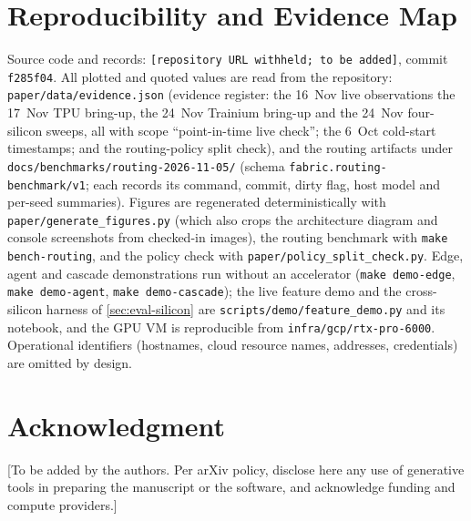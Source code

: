 \documentclass[conference,letterpaper]{IEEEtran}
\newcommand{\code}[1]{\texttt{\small #1}}
\newcommand{\repourl}{\texttt{[repository URL withheld; to be added]}}
\newcommand{\commit}{\code{f285f04}}
\begin{document}
\section{Reproducibility and Evidence Map}
\label{app:repro}
{\raggedright
Source code and records: \repourl, commit \commit. All plotted and quoted values are read from
the repository: \code{paper/data/evidence.json} (evidence register: the 16~Nov live observations
the 17~Nov TPU bring-up, the 24~Nov Trainium bring-up and the 24~Nov four-silicon sweeps, all with
scope ``point-in-time live check''; the 6~Oct cold-start
timestamps; and the routing-policy split check), and the routing artifacts under
\code{docs/benchmarks/routing-2026-11-05/} (schema \code{fabric.routing-benchmark/v1}; each records
its command, commit, dirty flag, host model and per-seed summaries). Figures are regenerated
deterministically with \code{paper/generate\_figures.py} (which also crops the architecture
diagram and console screenshots from checked-in images), the routing benchmark with
\code{make bench-routing}, and the policy check with \code{paper/policy\_split\_check.py}.
Edge, agent and cascade demonstrations run without an accelerator (\code{make demo-edge},
\code{make demo-agent}, \code{make demo-cascade}); the live feature demo and the cross-silicon
harness of \cref{sec:eval-silicon} are \code{scripts/demo/feature\_demo.py} and its notebook, and
the GPU VM is reproducible from \code{infra/gcp/rtx-pro-6000}. Operational identifiers (hostnames, cloud
resource names, addresses, credentials) are omitted by design.\par}

\section*{Acknowledgment}
[To be added by the authors. Per arXiv policy, disclose here any use of generative tools in
preparing the manuscript or the software, and acknowledge funding and compute providers.]



\end{document}
